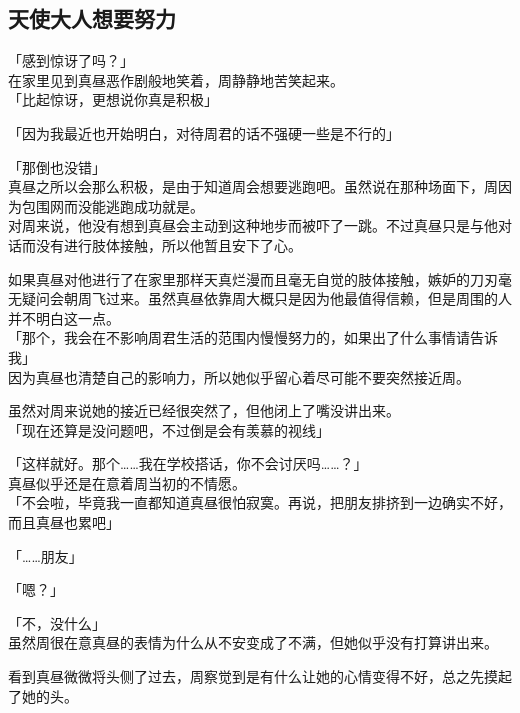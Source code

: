 \subsection{天使大人想要努力}

「感到惊讶了吗？」\\

在家里见到真昼恶作剧般地笑着，周静静地苦笑起来。\\

「比起惊讶，更想说你真是积极」

「因为我最近也开始明白，对待周君的话不强硬一些是不行的」

「那倒也没错」\\

真昼之所以会那么积极，是由于知道周会想要逃跑吧。虽然说在那种场面下，周因为包围网而没能逃跑成功就是。\\

对周来说，他没有想到真昼会主动到这种地步而被吓了一跳。不过真昼只是与他对话而没有进行肢体接触，所以他暂且安下了心。

如果真昼对他进行了在家里那样天真烂漫而且毫无自觉的肢体接触，嫉妒的刀刃毫无疑问会朝周飞过来。虽然真昼依靠周大概只是因为他最值得信赖，但是周围的人并不明白这一点。\\

「那个，我会在不影响周君生活的范围内慢慢努力的，如果出了什么事情请告诉我」\\

因为真昼也清楚自己的影响力，所以她似乎留心着尽可能不要突然接近周。

虽然对周来说她的接近已经很突然了，但他闭上了嘴没讲出来。\\

「现在还算是没问题吧，不过倒是会有羡慕的视线」

「这样就好。那个……我在学校搭话，你不会讨厌吗……？」\\

真昼似乎还是在意着周当初的不情愿。\\

「不会啦，毕竟我一直都知道真昼很怕寂寞。再说，把朋友排挤到一边确实不好，而且真昼也累吧」

「……朋友」

「嗯？」

「不，没什么」\\

虽然周很在意真昼的表情为什么从不安变成了不满，但她似乎没有打算讲出来。

看到真昼微微将头侧了过去，周察觉到是有什么让她的心情变得不好，总之先摸起了她的头。\\


